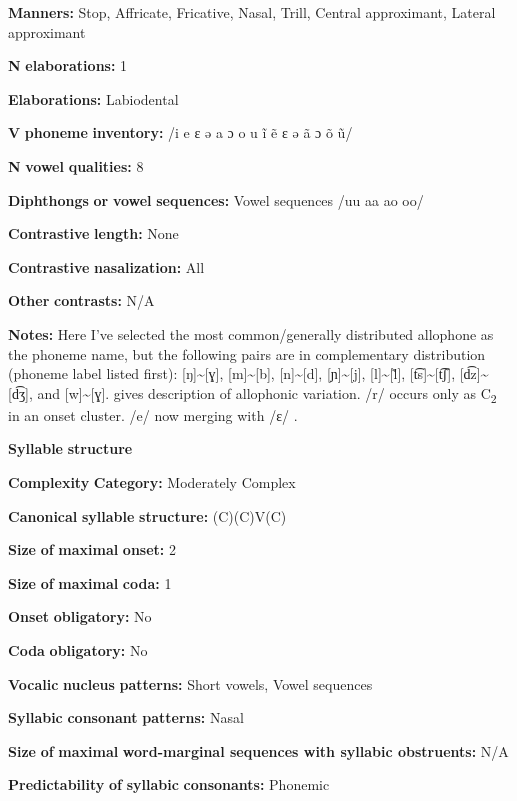 \begin{styleBody}
\textbf{Manners:} Stop, Affricate, Fricative, Nasal, Trill, Central approximant, Lateral approximant

\textbf{N} \textbf{elaborations:} 1

\textbf{Elaborations:} Labiodental

\textbf{V} \textbf{phoneme} \textbf{inventory:} /i e ɛ ə a ɔ o u ĩ ẽ ɛ ə ã ɔ õ ũ/

\textbf{N} \textbf{vowel} \textbf{qualities:} 8

\textbf{Diphthongs} \textbf{or} \textbf{vowel} \textbf{sequences:} Vowel sequences /uu aa ao oo/

\textbf{Contrastive} \textbf{length:} None

\textbf{Contrastive} \textbf{nasalization:} All

\textbf{Other} \textbf{contrasts:} N/A

\textbf{Notes:} Here I’ve selected the most common/generally distributed allophone as the phoneme name, but the following pairs are in complementary distribution (phoneme label listed first): [ŋ]{\textasciitilde}[ɣ], [m]{\textasciitilde}[b], [n]{\textasciitilde}[d], [ɲ]{\textasciitilde}[j], [l]{\textasciitilde}[\~{l}], [t͡s]{\textasciitilde}[t͡ʃ], [d͡z]{\textasciitilde}[d͡ʒ], and [w]{\textasciitilde}[ɣ]. \citet[10-18]{Duthie1996} gives description of allophonic variation. /r/ occurs only as C\textsubscript{2} in an onset cluster. /e/ now merging with /ɛ/ \citep[19]{Duthie1996}.

\textbf{Syllable} \textbf{structure}

\textbf{Complexity} \textbf{Category:} Moderately Complex

\textbf{Canonical} \textbf{syllable} \textbf{structure:} (C)(C)V(C) \citep[38-9]{Ameka1991}

\textbf{Size} \textbf{of} \textbf{maximal} \textbf{onset:} 2

\textbf{Size} \textbf{of} \textbf{maximal} \textbf{coda:} 1

\textbf{Onset} \textbf{obligatory:} No

\textbf{Coda} \textbf{obligatory:} No

\textbf{Vocalic} \textbf{nucleus} \textbf{patterns:} Short vowels, Vowel sequences

\textbf{Syllabic} \textbf{consonant} \textbf{patterns:} Nasal

\textbf{Size} \textbf{of} \textbf{maximal} \textbf{word{}-marginal sequences with syllabic obstruents:} N/A

\textbf{Predictability} \textbf{of} \textbf{syllabic} \textbf{consonants:} Phonemic


\end{styleBody}
